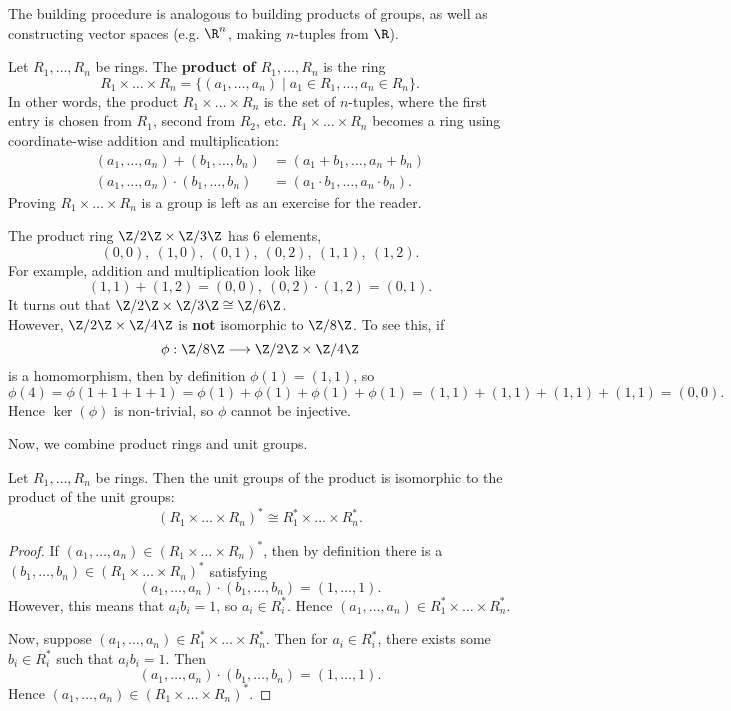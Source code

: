 \documentclass[math1530-lecture-notes]{subfiles}
\begin{document}
The building procedure is analogous to building products of groups, as well as constructing vector
spaces (e.g. $\R^{n}$, making $n$-tuples from $\R$).

\begin{definition}{}
  Let $R_1,\ldots,R_n$ be rings. The \textbf{product of $R_1,\ldots,R_n$} is the ring \[
    R_1\times \ldots\times R_n = \{(a_1,\ldots,a_n)\mid a_1\in R_1,\ldots,a_n\in R_n \} 
  .\] In other words, the product $R_1\times \ldots\times R_n$ is the set of $n$-tuples, where the
  first entry is chosen from $R_1$, second from $R_2$, etc. $R_1\times \ldots\times R_n$ becomes a
  ring using coordinate-wise addition and multiplication:
  \begin{align*}
    (a_1,\ldots,a_n)+(b_1,\ldots,b_n) &= (a_1+b_1,\ldots,a_n+b_n)\\
    (a_1,\ldots,a_n)\cdot (b_1,\ldots,b_n) &= (a_1\cdot b_1,\ldots,a_n\cdot b_n)
  .\end{align*} Proving $ R_1\times \ldots\times R_n$ is a group is left as an exercise for the
  reader.
\end{definition}

\begin{example}
  The product ring $\Z/ 2\Z \times  \Z / 3\Z$ has $6$ elements, \[
    (0,0),\ (1,0),\ (0,1),\ (0,2),\ (1,1),\ (1,2)
  .\] For example, addition and multiplication look like \[
    (1,1)+(1,2)=(0,0),\ (0,2)\cdot (1,2)=(0,1)
  .\] It turns out that $\Z / 2\Z \times  \Z / 3\Z \cong \Z / 6\Z$.\\

  However, $\Z / 2\Z\times \Z / 4\Z$ is \textbf{not} isomorphic to $\Z / 8\Z$. To see this, if \[
    \phi: \Z / 8\Z \longrightarrow \Z / 2\Z \times  \Z / 4\Z
  \] is a homomorphism, then by definition $\phi(1)=(1,1)$, so \[
  \phi(4)=\phi(1+1+1+1) = \phi(1)+\phi(1)+\phi(1)+\phi(1) = (1,1) + (1,1)+(1,1)+(1,1)=(0,0)
  .\] Hence $\ker(\phi)$ is non-trivial, so $\phi$ cannot be injective.
\end{example}

Now, we combine product rings and unit groups.
\begin{proposition}[]{}
  Let $R_1,\ldots,R_n$ be rings. Then the unit groups of the product is isomorphic to the product of
  the unit groups: \[
    \left( R_1\times \ldots\times R_n \right)^* \cong R_1^*\times \ldots\times R_n^*
  .\] 
\end{proposition}
\begin{proof}[Proof]
  If $(a_1,\ldots,a_n)\in \left( R_1\times \ldots\times R_n \right)^*$, then by definition there is
  a $(b_1,\ldots,b_n)\in \left( R_1\times \ldots\times R_n \right)^{*}$ satisfying \[
    (a_1,\ldots,a_n)\cdot (b_1,\ldots,b_n)=(1,\ldots,1)
  .\] However, this means that $a_ib_i=1$, so $a_i \in R_i^*$. Hence $(a_1,\ldots,a_n)\in
  R_1^{*}\times \ldots\times R_n^{*}$.

  Now, suppose $(a_1,\ldots,a_n)\in R_1^{*}\times \ldots\times R_n^{*}$. Then for $a_i\in R_i^{*}$,
  there exists some $b_i\in R_i^{*}$ such that $a_ib_i=1$. Then \[
    (a_1,\ldots,a_n)\cdot (b_1,\ldots,b_n)=(1,\ldots,1)
  .\] Hence $(a_1,\ldots,a_n)\in \left( R_1\times \ldots\times R_n \right)^*$.
\end{proof}
\end{document}
